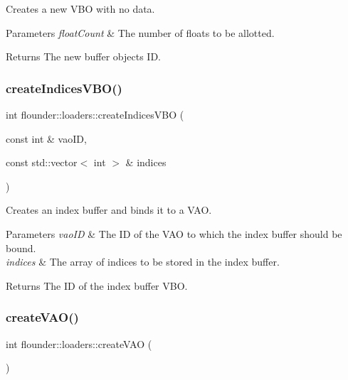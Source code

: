 Creates a new V\+BO with no data. 


\begin{DoxyParams}{Parameters}
{\em float\+Count} & The number of floats to be allotted. \\
\hline
\end{DoxyParams}
\begin{DoxyReturn}{Returns}
The new buffer objects ID. 
\end{DoxyReturn}
\mbox{\label{classflounder_1_1loaders_af17aa2917eb49dc484908617bb806cd7}} 
\subsubsection{\texorpdfstring{create\+Indices\+V\+B\+O()}{createIndicesVBO()}}
{\footnotesize\ttfamily int flounder\+::loaders\+::create\+Indices\+V\+BO (\begin{DoxyParamCaption}\item[{const int \&}]{vao\+ID,  }\item[{const std\+::vector$<$ int $>$ \&}]{indices }\end{DoxyParamCaption})}



Creates an index buffer and binds it to a V\+AO. 


\begin{DoxyParams}{Parameters}
{\em vao\+ID} & The ID of the V\+AO to which the index buffer should be bound. \\
\hline
{\em indices} & The array of indices to be stored in the index buffer. \\
\hline
\end{DoxyParams}
\begin{DoxyReturn}{Returns}
The ID of the index buffer V\+BO. 
\end{DoxyReturn}
\mbox{\label{classflounder_1_1loaders_a6788892ee32899599c65722fe1ccfbf3}} 
\subsubsection{\texorpdfstring{create\+V\+A\+O()}{createVAO()}}
{\footnotesize\ttfamily int flounder\+::loaders\+::create\+V\+AO (\begin{DoxyParamCaption}{ }\end{DoxyParamCaption})}




